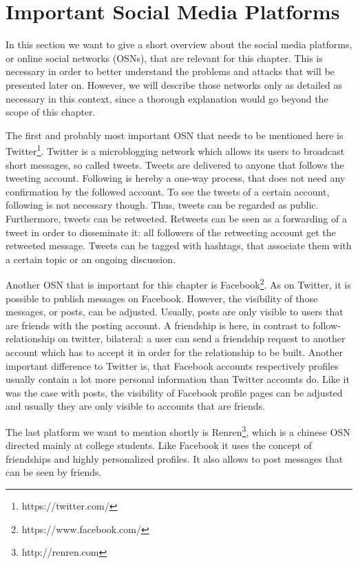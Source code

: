 \section{Important Social Media Platforms}

In this section we want to give a short overview about the social media platforms, or online social networks (OSNs), that are relevant for this chapter. This is necessary in order to better understand the problems and attacks that will be presented later on. However, we will describe those networks only as detailed as necessary in this context, since a thorough explanation would go beyond the scope of this chapter.

The first and probably most important OSN that needs to be mentioned here is Twitter\footnote{https://twitter.com/}. Twitter is a microblogging network which allows its users to broadcast short messages, so called tweets. Tweets are delivered to anyone that follows the tweeting account. Following is hereby a one-way process, that does not need any confirmation by the followed account. To see the tweets of a certain account, following is not necessary though. Thus, tweets can be regarded as public. Furthermore, tweets can be retweeted. Retweets can be seen as a forwarding of a tweet in order to disseminate it: all followers of the retweeting account get the retweeted message.  Tweets can be tagged with hashtags, that associate them with a certain topic or an ongoing discussion.

Another OSN that is important for this chapter is Facebook\footnote{https://www.facebook.com/}. As on Twitter, it is possible to publish messages on Facebook. However, the visibility of those messages, or posts, can be adjusted. Usually, posts are only visible to users that are friends with the posting account. A friendship is here, in contrast to follow-relationship on twitter, bilateral: a user can send a friendship request to another account which has to accept it in order for the relationship to be built. Another important difference to Twitter is, that Facebook accounts respectively profiles usually contain a lot more personal information than Twitter accounts do. Like it was the case with posts, the visibility of Facebook profile pages can be adjusted and usually they are only visible to accounts that are friends.

The last platform we want to mention shortly is Renren\footnote{http://renren.com}, which is a chinese OSN directed mainly at college students. Like Facebook it uses the concept of friendships and highly personalized profiles. It also allows to post messages that can be seen by friends.

